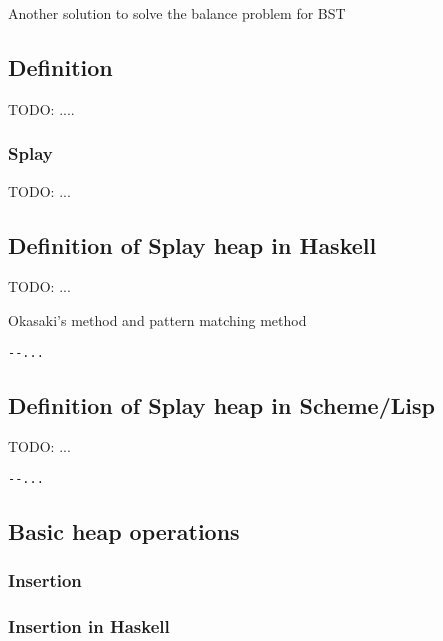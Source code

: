 \documentclass{article}
\begin{document}
Another solution to solve the balance problem for BST

\subsection{Definition}

TODO: ....

\subsubsection{Splay}

TODO: ...

\subsection*{Definition of Splay heap in Haskell}

TODO: ...

Okasaki's method and pattern matching method

\lstset{language=Haskell}
\begin{lstlisting}
--...
\end{lstlisting}

\subsection*{Definition of Splay heap in Scheme/Lisp}

TODO: ...

\lstset{language=lisp}
\begin{lstlisting}
--...
\end{lstlisting}

\subsection{Basic heap operations}

\subsubsection{Insertion}

\subsubsection*{Insertion in Haskell}
\end{document}

